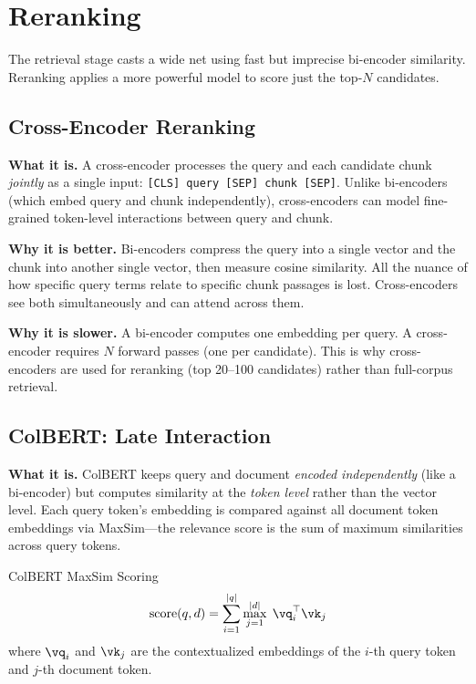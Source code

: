 \section{Reranking}
\label{sec:reranking}

The retrieval stage casts a wide net using fast but imprecise bi-encoder similarity. Reranking applies a more powerful model to score just the top-$N$ candidates.

\subsection{Cross-Encoder Reranking}

\textbf{What it is.} A cross-encoder processes the query and each candidate chunk \textit{jointly} as a single input: \texttt{[CLS] query [SEP] chunk [SEP]}. Unlike bi-encoders (which embed query and chunk independently), cross-encoders can model fine-grained token-level interactions between query and chunk.

\textbf{Why it is better.} Bi-encoders compress the query into a single vector and the chunk into another single vector, then measure cosine similarity. All the nuance of how specific query terms relate to specific chunk passages is lost. Cross-encoders see both simultaneously and can attend across them.

\textbf{Why it is slower.} A bi-encoder computes one embedding per query. A cross-encoder requires $N$ forward passes (one per candidate). This is why cross-encoders are used for reranking (top 20--100 candidates) rather than full-corpus retrieval.

\subsection{ColBERT: Late Interaction}

\textbf{What it is.} ColBERT keeps query and document \textit{encoded independently} (like a bi-encoder) but computes similarity at the \textit{token level} rather than the vector level. Each query token's embedding is compared against all document token embeddings via MaxSim---the relevance score is the sum of maximum similarities across query tokens.

\begin{mathresult}{ColBERT MaxSim Scoring}
\[
\text{score}(q, d) = \sum_{i=1}^{|q|} \max_{j=1}^{|d|} \; \vq_i^\top \vk_j
\]
where $\vq_i$ and $\vk_j$ are the contextualized embeddings of the $i$-th query token and $j$-th document token.
\end{mathresult}

